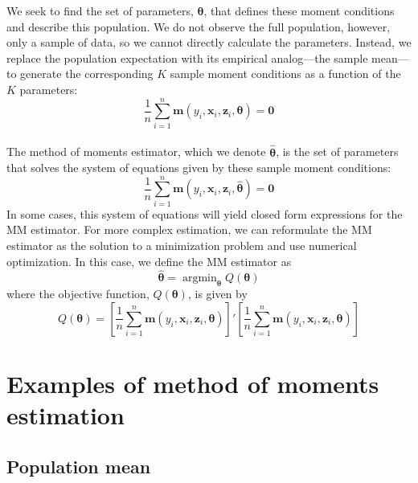 \documentclass[11pt,letterpaper]{article}
\DeclareMathOperator*{\argmin}{argmin}
\begin{document}
\noindent We seek to find the set of parameters, $\bm{\theta}$, that defines these moment conditions and describe this population. We do not observe the full population, however, only a sample of data, so we cannot directly calculate the parameters. Instead, we replace the population expectation with its empirical analog---the sample mean---to generate the corresponding $K$ sample moment conditions as a function of the $K$ parameters:
$$\frac{1}{n} \sum_{i = 1}^n \bm{m}(y_i, \bm{x}_i, \bm{z}_i, \bm{\theta}) = \bm{0}$$ \\

\noindent The method of moments estimator, which we denote $\widehat{\bm{\theta}}$, is the set of parameters that solves the system of equations given by these sample moment conditions:
$$\frac{1}{n} \sum_{i = 1}^n \bm{m}(y_i, \bm{x}_i, \bm{z}_i, \widehat{\bm{\theta}}) = \bm{0}$$
In some cases, this system of equations will yield closed form expressions for the MM estimator. For more complex estimation, we can reformulate the MM estimator as the solution to a minimization problem and use numerical optimization. In this case, we define the MM estimator as
$$\widehat{\bm{\theta}} = \argmin_{\bm{\theta}} Q(\bm{\theta})$$
where the objective function, $Q(\bm{\theta})$, is given by
$$Q(\bm{\theta}) = \left[ \frac{1}{n} \sum_{i = 1}^n \bm{m}(y_i, \bm{x}_i, \bm{z}_i, \bm{\theta}) \right]' \left[ \frac{1}{n} \sum_{i = 1}^n \bm{m}(y_i, \bm{x}_i, \bm{z}_i, \bm{\theta}) \right]$$

\section{Examples of method of moments estimation}

\subsection{Population mean}
\end{document}
